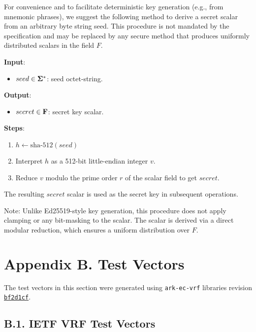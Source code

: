 \documentclass[
]{article}
\providecommand{\tightlist}{%
  \setlength{\itemsep}{0pt}\setlength{\parskip}{0pt}}
\begin{document}
For convenience and to facilitate deterministic key generation (e.g.,
from mnemonic phrases), we suggest the following method to derive a
secret scalar from an arbitrary byte string seed. This procedure is not
mandated by the specification and may be replaced by any secure method
that produces uniformly distributed scalars in the field \(F\).

\textbf{Input}:

\begin{itemize}
\tightlist
\item
  \(seed \in \bold{\Sigma}^*\): seed octet-string.
\end{itemize}

\textbf{Output}:

\begin{itemize}
\tightlist
\item
  \(secret \in \bold{F}\): secret key scalar.
\end{itemize}

\textbf{Steps}:

\begin{enumerate}
\def\labelenumi{\arabic{enumi}.}
\tightlist
\item
  \(h \gets \text{sha-512}(seed)\)
\item
  Interpret \(h\) as a 512-bit little-endian integer \(v\).
\item
  Reduce \(v\) modulo the prime order \(r\) of the scalar field to get
  \(secret\).
\end{enumerate}

The resulting \(secret\) scalar is used as the secret key in subsequent
operations.

Note: Unlike Ed25519-style key generation, this procedure does not apply
clamping or any bit-masking to the scalar. The scalar is derived via a
direct modular reduction, which ensures a uniform distribution over
\(F\).

\section{Appendix B. Test Vectors}\label{appendix-b.-test-vectors}

The test vectors in this section were generated using
\texttt{ark-ec-vrf} libraries revision
\href{https://github.com/davxy/ark-vrf/tree/bf2d1cf8ec648cf57b0eb1252639798481e05a29}{\texttt{bf2d1cf}}.

\subsection{B.1. IETF VRF Test
Vectors}\label{b.1.-ietf-vrf-test-vectors}
\end{document}
